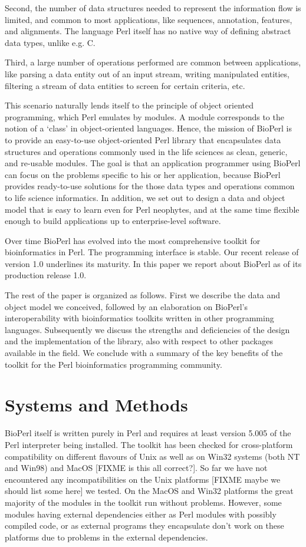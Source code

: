 \documentclass{article}
\begin{document}
\begin{twocolumn}
Second, the number of data structures needed to represent the
information flow is limited, and common to most applications, like
sequences, annotation, features, and alignments. The language Perl
itself has no native way of defining abstract data types, unlike
e.g. C.

Third, a large number of operations performed are common between
applications, like parsing a data entity out of an input stream,
writing manipulated entities, filtering a stream of data entities to
screen for certain criteria, etc. 

This scenario naturally lends itself to the principle of object
oriented programming, which Perl emulates by modules. A module
corresponds to the notion of a `class' in object-oriented languages.
Hence, the mission of BioPerl is to provide an easy-to-use
object-oriented Perl library that encapsulates data structures and
operations commonly used in the life sciences as clean, generic, and
re-usable modules. The goal is that an application programmer using
BioPerl can focus on the problems specific to his or her application,
because BioPerl provides ready-to-use solutions for the those data
types and operations common to life science informatics. In addition,
we set out to design a data and object model that is easy to learn
even for Perl neophytes, and at the same time flexible enough to build
applications up to enterprise-level software.

Over time BioPerl has evolved into the most comprehensive toolkit for
bioinformatics in Perl. The programming interface is stable. Our
recent release of version 1.0 underlines its maturity.  In this paper
we report about BioPerl as of its production release 1.0.

The rest of the paper is organized as follows. First we describe the
data and object model we conceived, followed by an elaboration on
BioPerl's interoperability with bioinformatics toolkits written in
other programming languages. Subsequently we discuss the strengths and
deficiencies of the design and the implementation of the library, also
with respect to other packages available in the field. We conclude
with a summary of the key benefits of the toolkit for the Perl
bioinformatics programming community.

\section{Systems and Methods}

BioPerl itself is written purely in Perl and requires at least version
5.005 of the Perl interpreter being installed. The toolkit has been
checked for cross-platform compatibility on different flavours of Unix
as well as on Win32 systems (both NT and Win98) and MacOS [FIXME is
this all correct?]. So far we have not encountered any
incompatibilities on the Unix platforms [FIXME maybe we should list
some here] we tested. On the MacOS and Win32 platforms the great
majority of the modules in the toolkit run without problems. However,
some modules having external dependencies either as Perl modules with
possibly compiled code, or as external programs they encapsulate don't
work on these platforms due to problems in the external dependencies.


\end{twocolumn}
\end{document}
